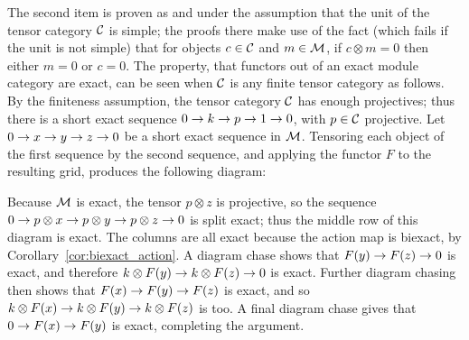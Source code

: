 \documentclass{amsart}
\begin{document}
The second item is proven as \cite[Prop. 3.11]{EO-ftc} and \cite[Prop 2.7.8]{EGNO} under the assumption that the unit of the tensor category $\mathcal C$ is simple; the proofs there make use of the fact (which fails if the unit is not simple) that for objects $c \in \mathcal C$ and $m \in \mathcal M$, if $c \otimes m = 0$ then either $m = 0$ or $c=0$.  The property, that functors out of an exact module category are exact, can be seen when $\mathcal C$ is any finite tensor category as follows.  By the finiteness assumption, the tensor category $\mathcal C$ has enough projectives; thus there is a short exact sequence $0 \rightarrow k \rightarrow p \rightarrow 1 \rightarrow 0$, with $p \in \mathcal C$ projective.  Let $0 \rightarrow x \rightarrow y \rightarrow z \rightarrow 0$ be a short exact sequence in $\mathcal M$.  Tensoring each object of the first sequence by the second sequence, and applying the functor $F$ to the resulting grid, produces the following diagram:
	\begin{center}
	\end{center}
Because $\mathcal M$ is exact, the tensor $p \otimes z$ is projective, so the sequence $0 \rightarrow p \otimes x \rightarrow p \otimes y \rightarrow p \otimes z \rightarrow 0$ is split exact; thus the middle row of this diagram is exact. The columns are all exact because the action map is biexact, by Corollary~\ref{cor:biexact_action}.  A diagram chase shows that $F(y) \rightarrow F(z) \rightarrow 0$ is exact, and therefore $k \otimes F(y) \rightarrow k \otimes F(z) \rightarrow 0$ is exact.  Further diagram chasing then shows that $F(x) \rightarrow F(y) \rightarrow F(z)$ is exact, and so $k \otimes F(x) \rightarrow k \otimes F(y) \rightarrow k \otimes F(z)$ is too.  A final diagram chase gives that $0 \rightarrow F(x) \rightarrow F(y)$ is exact, completing the argument.
\end{document}
